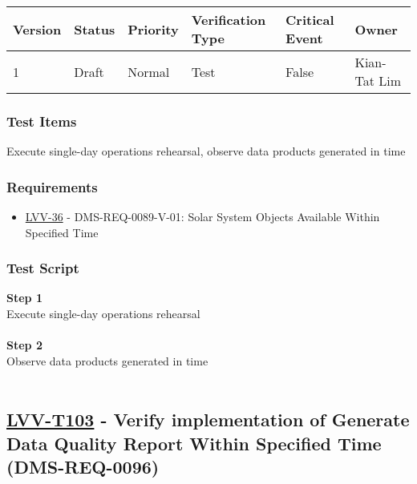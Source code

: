 \begin{longtable}[]{@{}llllll@{}}
\toprule
Version & Status & Priority & Verification Type & Critical Event &
Owner\tabularnewline
\midrule
\endhead
1 & Draft & Normal & Test & False & Kian-Tat Lim\tabularnewline
\bottomrule
\end{longtable}

\hypertarget{test-items-2}{%
\subsubsection{Test Items}\label{test-items-2}}

Execute single-day operations rehearsal, observe data products generated
in time

\hypertarget{requirements-2}{%
\subsubsection{Requirements}\label{requirements-2}}

\begin{itemize}
\tightlist
\item
  \href{https://jira.lsstcorp.org/browse/LVV-36}{LVV-36} -
  DMS-REQ-0089-V-01: Solar System Objects Available Within Specified
  Time
\end{itemize}

\hypertarget{test-script-2}{%
\subsubsection{Test Script}\label{test-script-2}}

\textbf{Step 1}\\
Execute single-day operations rehearsal\\
~\\
\textbf{Step 2}\\
\hspace*{0.333em}Observe data products generated in time\\
~\\

\hypertarget{lvv-t103---verify-implementation-of-generate-data-quality-report-within-specified-time-dms-req-0096}{%
\subsection{\texorpdfstring{\href{https://jira.lsstcorp.org/secure/Tests.jspa\#/testCase/LVV-T103}{LVV-T103}
- Verify implementation of Generate Data Quality Report Within Specified
Time
(DMS-REQ-0096)}{LVV-T103 - Verify implementation of Generate Data Quality Report Within Specified Time (DMS-REQ-0096)}}\label{lvv-t103---verify-implementation-of-generate-data-quality-report-within-specified-time-dms-req-0096}}

